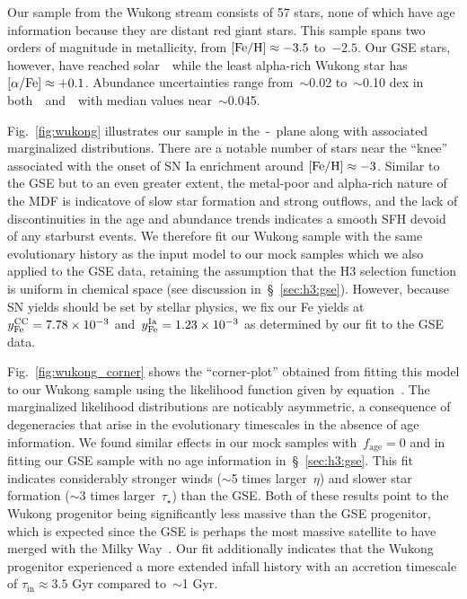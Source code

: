 \documentclass[ms.tex]{subfiles}
\begin{document}
Our sample from the Wukong stream consists of 57 stars, none of which have age
information because they are distant red giant stars.
This sample spans two orders of magnitude in metallicity, from
$\text{[Fe/H]} \approx -3.5$ to~$-2.5$.
Our GSE stars, however, have reached solar~\afe~while the least alpha-rich
Wukong star has~$\text{[$\alpha$/Fe]} \approx +0.1$.
Abundance uncertainties range from~$\sim$0.02 to~$\sim$0.10 dex in
both~\afe~and~\feh~with median values near~$\sim$0.045.
\par
Fig.~\ref{fig:wukong} illustrates our sample in the~\afe-\feh~plane along with
associated marginalized distributions. There are a notable number of stars near
the ``knee'' associated with the onset of SN Ia enrichment around
$\text{[Fe/H]} \approx -3$.
Similar to the GSE but to an even greater extent, the metal-poor and alpha-rich
nature of the MDF is indicatove of slow star formation and strong outflows, and
the lack of discontinuities in the age and abundance trends indicates a smooth
SFH devoid of any starburst events.
We therefore fit our Wukong sample with the same evolutionary history as the
input model to our mock samples which we also applied to the GSE data,
retaining the assumption that the H3 selection function is uniform in chemical
space (see discussion in~\S~\ref{sec:h3:gse}).
However, because SN yields should be set by stellar physics, we fix our Fe
yields at~$y_\text{Fe}^\text{CC} = 7.78\times10^{-3}$ and~$y_\text{Fe}^\text{Ia} = 1.23\times10^{-3}$ as
determined by our fit to the GSE data.
\par
Fig.~\ref{fig:wukong_corner} shows the ``corner-plot'' obtained from fitting
this model to our Wukong sample using the likelihood function given by
equation~.
The marginalized likelihood distributions are noticably asymmetric, a
consequence of degeneracies that arise in the evolutionary timescales in the
absence of age information.
We found similar effects in our mock samples with~$f_\text{age} = 0$ and in
fitting our GSE sample with no age information in~\S~\ref{sec:h3:gse}.
This fit indicates considerably stronger winds ($\sim$5 times larger~$\eta$)
and slower star formation ($\sim$3 times larger~$\tau_\star$) than the GSE.
Both of these results point to the Wukong progenitor being significantly less
massive than the GSE progenitor, which is expected since the GSE is perhaps the
most massive satellite to have merged with the Milky Way~\citep{Deason2019,
Fattahi2019, Mackereth2019, Vincenzo2019}.
Our fit additionally indicates that the Wukong progenitor experienced a more
extended infall history with an accretion timescale of
$\tau_\text{in} \approx 3.5$ Gyr compared to~$\sim$1 Gyr.
\end{document}

